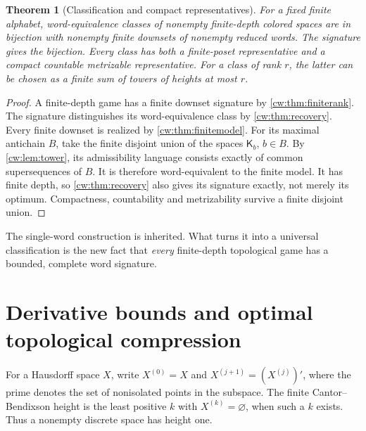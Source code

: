 \documentclass[11pt,letterpaper]{article}
\numberwithin{equation}{section}
\newtheorem{theorem}{Theorem}[section]
\theoremstyle{definition}
\theoremstyle{remark}
\theoremstyle{definition}
\newcommand{\Tw}{\mathsf K}
\begin{document}
\begin{theorem}[Classification and compact representatives]
\label{cw:thm:classification}
For a fixed finite alphabet, word-equivalence classes of nonempty finite-depth
colored spaces are in bijection with nonempty finite downsets of nonempty
reduced words. The signature gives the bijection. Every class has both a
finite-poset representative and a compact countable metrizable representative.
For a class of rank $r$, the latter can be chosen as a finite sum of towers
of heights at most $r$.
\end{theorem}
\begin{proof}
A finite-depth game has a finite downset signature by \cref{cw:thm:finiterank}.
The signature distinguishes its word-equivalence class by
\cref{cw:thm:recovery}. Every finite downset is realized by \cref{cw:thm:finitemodel}.
For its maximal antichain $B$, take the finite disjoint union of the spaces
$\Tw_b$, $b\in B$. By \cref{cw:lem:tower}, its admissibility language consists
exactly of common supersequences of $B$. It is therefore word-equivalent
to the finite model. It has finite depth, so \cref{cw:thm:recovery} also gives
its signature exactly, not merely its optimum. Compactness, countability
and metrizability survive a finite disjoint union.
\end{proof}

The single-word construction is inherited. What turns it into a universal
classification is the new fact that \emph{every} finite-depth topological
game has a bounded, complete word signature.

\section{Derivative bounds and optimal topological compression}
\label{cw:sec:height}

For a Hausdorff space $X$, write $X^{(0)}=X$ and
$X^{(j+1)}=(X^{(j)})'$, where the prime denotes the set of nonisolated
points in the subspace. The finite Cantor--Bendixson height is the least
positive $k$ with $X^{(k)}=\varnothing$, when such a $k$ exists.
Thus a nonempty discrete space has height one.
\end{document}
